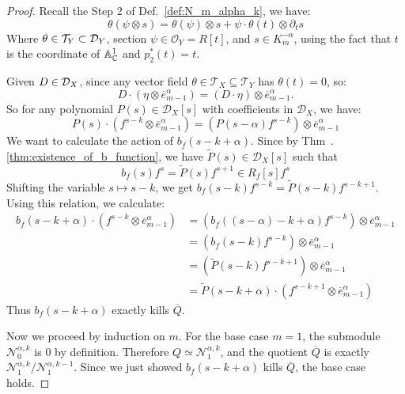 \begin{proof}
    Recall the Step 2 of Def.~\ref{def:N_m_alpha_k}, we have:
    \[
        \theta(\psi \otimes s) = \theta(\psi) \otimes s + \psi \cdot \theta(t) \otimes \partial_t s
    \]
    Where $\theta \in \mathcal{T}_Y\subset\mathcal{D}_Y$,
    section $\psi \in \mathcal{O}_Y = R[t]$, and $s \in K_m^{-\alpha}$, using the fact that $t$ is the coordinate of $\mathbb{A}^1_{\mathbb{C}}$ and $p_2^*(t) = t$.

    Given $D\in\mathcal{D}_X$, since any vector field $\theta \in \mathcal{T}_X\subseteq\mathcal{T}_Y$ has $\theta(t)=0$, so:
    $$
        D \cdot (\eta \otimes \overline{e}^\alpha_{m-1}) = (D \cdot \eta) \otimes \overline{e}^\alpha_{m-1}.
    $$
    So for any polynomial $P(s) \in \mathcal{D}_X[s]$ with coefficients in $\mathcal{D}_X$, we have:
    $$
        P(s) \cdot (f^{s-k} \otimes \overline{e}^\alpha_{m-1}) = (P(s-\alpha) f^{s-k}) \otimes \overline{e}^\alpha_{m-1}
    $$
    We want to calculate the action of $b_f(s-k+\alpha)$.
    Since by Thm~.\ref{thm:existence_of_b_function}, we have $\widetilde{P}(s) \in \mathcal{D}_X[s]$ such that
    $$
        b_f(s) f^s = \widetilde{P}(s) f^{s+1} \in R_f[s]f^s
    $$
    Shifting the variable $s \mapsto s-k$, we get $b_f(s-k)f^{s-k} = \widetilde{P}(s-k)f^{s-k+1}$.
    Using this relation, we calculate:
    \begin{align*}
        b_f(s-k+\alpha) \cdot (f^{s-k} \otimes \overline{e}^\alpha_{m-1})
         & = (b_f((s-\alpha)-k+\alpha) f^{s-k}) \otimes \overline{e}^\alpha_{m-1}          \\
         & = (b_f(s-k) f^{s-k}) \otimes \overline{e}^\alpha_{m-1}                          \\
         & = (\widetilde{P}(s-k) f^{s-k+1}) \otimes \overline{e}^\alpha_{m-1}              \\
         & = \widetilde{P}(s-k+\alpha) \cdot (f^{s-k+1} \otimes \overline{e}^\alpha_{m-1})
    \end{align*}
    Thus $b_f(s-k+\alpha)$ exactly kills $\overline{Q}$.

    Now we proceed by induction on $m$.
    For the base case $m=1$, the submodule $\mathcal{N}_0^{\alpha,k}$ is 0 by definition.
    Therefore $Q \simeq \mathcal{N}_1^{\alpha,k}$, and the quotient $\overline{Q}$ is exactly $\mathcal{N}_1^{\alpha,k} \big/ \mathcal{N}_1^{\alpha,k-1}$.
    Since we just showed $b_f(s-k+\alpha)$ kills $\overline{Q}$, the base case holds.


\end{proof}
